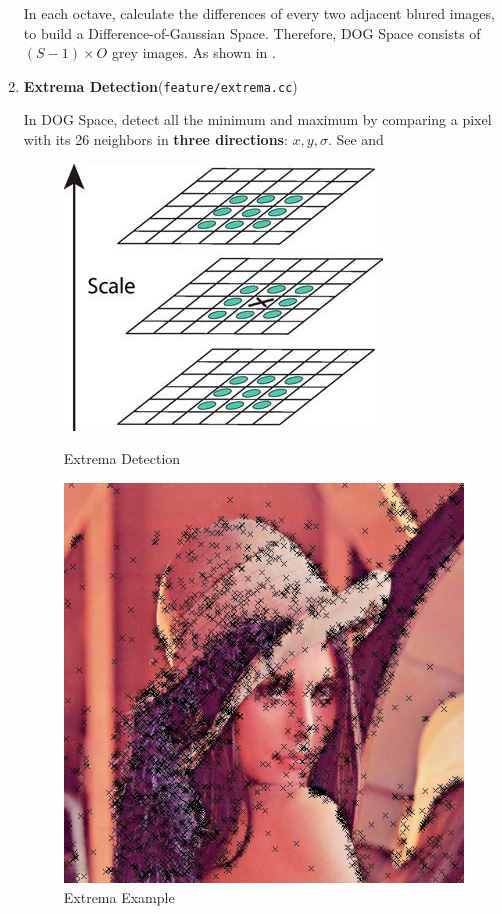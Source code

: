 \begin{enumerate}
    In each octave, calculate the differences of every two adjacent blured images, to build a Difference-of-Gaussian Space.
    Therefore, DOG Space consists of $ (S - 1) \times O$ grey images.
    As shown in .

  \item \textbf{Extrema Detection}(\verb|feature/extrema.cc|)

    In DOG Space, detect all the minimum and maximum
    by comparing a pixel with its 26 neighbors in \textbf{three directions}: $ x, y, \sigma$.
    See  and 
    \begin{figure}[H]
      \begin{minipage}[b]{0.46\linewidth}
        \centering
        \includegraphics[scale=0.4]{res/extrema.png}
        \caption{Extrema Detection\label{fig:extrema}}
      \end{minipage}
      \hspace{1em}
      \begin{minipage}[b]{0.46\linewidth}
        \centering
        \includegraphics[scale=0.35]{res/extrema_lenna.png}
        \caption{Extrema Example\label{fig:extrema2}}
      \end{minipage}
    \end{figure}


\end{enumerate}
